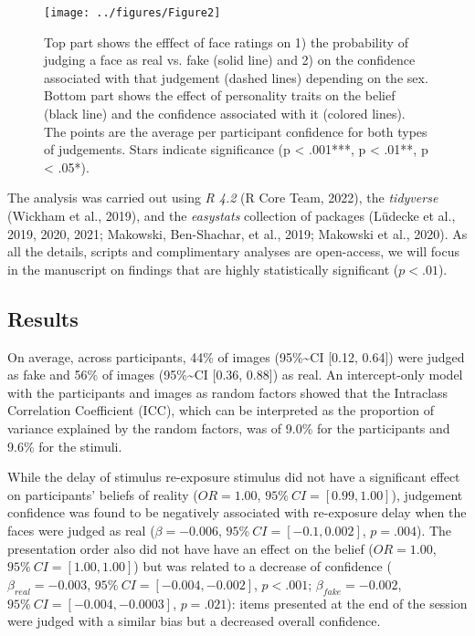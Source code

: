 \documentclass[
  man,floatsintext]{apa6}
\begin{document}
\begin{figure}
\texttt{[image: ../figures/Figure2]} \caption{Top part shows the efffect of face ratings on 1) the probability of judging a face as real vs. fake (solid line) and 2) on the confidence associated with that judgement (dashed lines) depending on the sex. Bottom part shows the effect of personality traits on the belief (black line) and the confidence associated with it (colored lines). The points are the average per participant confidence for both types of judgements. Stars indicate significance (p < .001***, p < .01**, p < .05*).}\label{fig:unnamed-chunk-3}
\end{figure}

The analysis was carried out using \emph{R 4.2} (R Core Team, 2022), the \emph{tidyverse} (Wickham et al., 2019), and the \emph{easystats} collection of packages (Lüdecke et al., 2019, 2020, 2021; Makowski, Ben-Shachar, et al., 2019; Makowski et al., 2020). As all the details, scripts and complimentary analyses are open-access, we will focus in the manuscript on findings that are highly statistically significant (\(p <.01\)).

\hypertarget{results}{%
\subsection{Results}\label{results}}

On average, across participants, 44\% of images (95\%\textasciitilde CI {[}0.12, 0.64{]}) were judged as fake and 56\% of images (95\%\textasciitilde CI {[}0.36, 0.88{]}) as real. An intercept-only model with the participants and images as random factors showed that the Intraclass Correlation Coefficient (ICC), which can be interpreted as the proportion of variance explained by the random factors, was of 9.0\% for the participants and 9.6\% for the stimuli.

While the delay of stimulus re-exposure stimulus did not have a significant effect on participants' beliefs of reality (\(OR = 1.00\), \(95\%~CI = [0.99, 1.00]\)), judgement confidence was found to be negatively associated with re-exposure delay when the faces were judged as real (\(\beta = -0.006\), \(95\%~CI = [-0.1, 0.002]\), \(p = .004\)). The presentation order also did not have have an effect on the belief (\(OR = 1.00\), \(95\%~CI = [1.00, 1.00]\)) but was related to a decrease of confidence (\(\beta_{real} = -0.003\), \(95\%~CI = [-0.004, -0.002]\), \(p < .001\); \(\beta_{fake} = -0.002\), \(95\%~CI = [-0.004, -0.0003]\), \(p = .021\)): items presented at the end of the session were judged with a similar bias but a decreased overall confidence.
\end{document}
